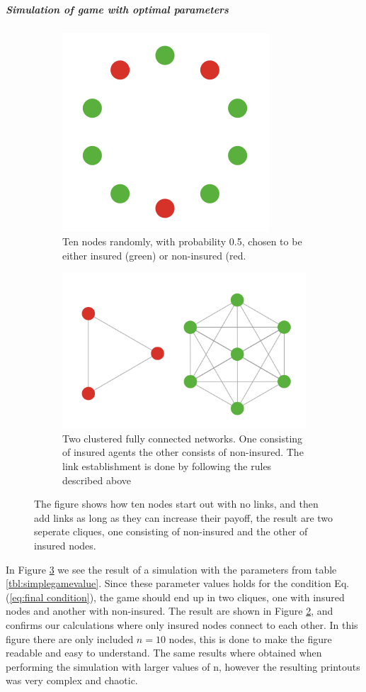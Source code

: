 \subparagraph{Simulation of game with optimal parameters}
\begin{figure}[h]
\centering
\begin{subfigure}{.5\textwidth}
  \centering
  \includegraphics[width=0.4\linewidth]{../Figures/FirstSimulationStart.png}
  \caption{\label{fig:firstsimulationstart} Ten nodes randomly, with probability 0.5, chosen to be either insured (green) or non-insured (red.}
\end{subfigure}
\quad
\begin{subfigure}{.46\textwidth}
  \centering
  \includegraphics[width=0.8\linewidth]{../Figures/FirstSimulationResult.png}
  \caption{\label{fig:firstsimulationresult} Two clustered fully connected networks. One consisting of insured agents the other consists of non-insured. The link establishment is done by following the rules described above}
\end{subfigure}
\caption{\label{fig:firstsimulation} The figure shows how ten nodes start out with no links, and then add links as long as they can increase their payoff, the result are two seperate cliques, one consisting of non-insured and the other of insured nodes.}
\end{figure}
In Figure \ref{fig:firstsimulation} we see the result of a simulation with the parameters from table \ref{tbl:simplegamevalue}. Since these parameter values holds for the condition Eq.(\ref{eq:final condition}), the game should end up in two cliques, one with insured nodes and another with non-insured. The result are shown in Figure \ref{fig:firstsimulationresult}, and confirms our calculations where only insured nodes connect to each other.  
In this figure there are only included $n=10$ nodes, this is done to make the figure readable and easy to understand.
The same results where obtained when performing the simulation with larger values of n, however the resulting printouts was very complex and chaotic.


